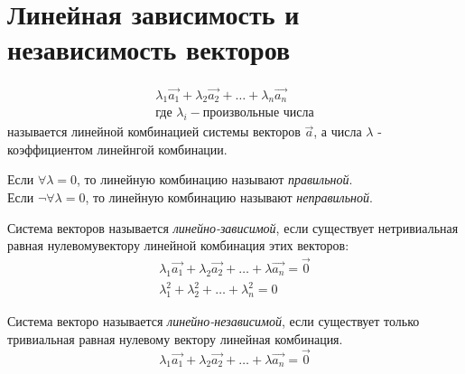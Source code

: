 
\section{Линейная зависимость и независимость векторов}

\begin{definition}
  \begin{gather*}
    \lambda_1 \vec{a_1} + \lambda_2 \vec{a_2} + \ldots + \lambda_n \vec{a_n} \\
    \text{где } \lambda_i - \text{произвольные числа}
  \end{gather*}
  называется линейной комбинацией системы векторов $\vec{a}$, а числа $\lambda$ - коэффициентом линейнгой комбинации.  \\
\end{definition}

Если $\forall \lambda = 0$, то линейную комбинацию называют \textit{правильной}. \\
Если $\neg \forall \lambda = 0$, то линейную комбинацию называют \textit{неправильной}. 

\begin{definition}
Система векторов называется \textit{линейно-зависимой}, если существует нетривиальная равная нулевомувектору линейной комбинация этих векторов:
  \begin{gather*}
    \lambda_1 \vec{a_1} + \lambda_2 \vec{a_2} + \ldots + \lambda \vec{a_n} = \vec{0} \\
    \lambda_1^2 + \lambda_2^2 + \ldots + \lambda_n^2 = 0
  \end{gather*}
\end{definition}

\begin{definition}
  Система векторо называется \textit{линейно-независимой}, если существует только тривиальная равная нулевому вектору линейная комбинация.
  \[
    \lambda_1 \vec{a_1} + \lambda_2 \vec{a_2} + \ldots + \lambda \vec{a_n} = \vec{0}
  \] 
\end{definition}


